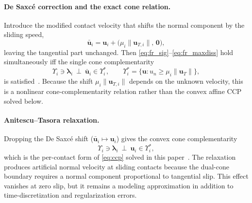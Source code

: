 \documentclass{article}
\newcommand{\blam}{\boldsymbol{\lambda}}
\newcommand{\cone}{\Upsilon}
\newcommand{\uvel}{\mathbf{u}}           %
\theoremstyle{plain}
\theoremstyle{definition}
\begin{document}
\paragraph{De Saxc\'e correction and the exact cone relation.} Introduce the modified
contact velocity that shifts the normal component by the sliding speed,
\begin{equation}
\bar{\uvel}_i=\uvel_i+\bigl(\mu_i\|\mathbf u_{T,i}\|,\,\mathbf 0\bigr),
\label{eq:desaxce}
\end{equation}
leaving the tangential part unchanged. Then \eqref{eq:fr_sig}--\eqref{eq:fr_maxdiss}
hold simultaneously iff the single cone complementarity
\begin{equation}
\cone_i\ni\blam_i\ \perp\ \bar{\uvel}_i\in\cone_i^{*},
\qquad \cone_i^{*}=\{\uvel:u_n\ge\mu_i\|\mathbf u_T\|\},
\label{eq:exact_ccp}
\end{equation}
is satisfied~\cite{desaxce1991}. Because the shift
$\mu_i\|\mathbf u_{T,i}\|$ depends on the unknown velocity, this is a nonlinear
cone-complementarity relation rather than the convex affine CCP solved below.

\paragraph{Anitescu--Tasora relaxation.} Dropping the De Saxc\'e shift
($\bar{\uvel}_i\mapsto\uvel_i$) gives the convex cone complementarity
\begin{equation}
\cone_i\ni\blam_i\ \perp\ \uvel_i\in\cone_i^{*},
\label{eq:at_ccp}
\end{equation}
which is the per-contact form of \eqref{eq:ccp} solved in this
paper~\cite{anitescu2006,tasora2011}. The relaxation produces artificial normal
velocity at sliding contacts because the dual-cone boundary requires a normal
component proportional to tangential slip. This effect vanishes at zero slip,
but it remains a modeling approximation in addition to time-discretization and
regularization errors.
\end{document}
